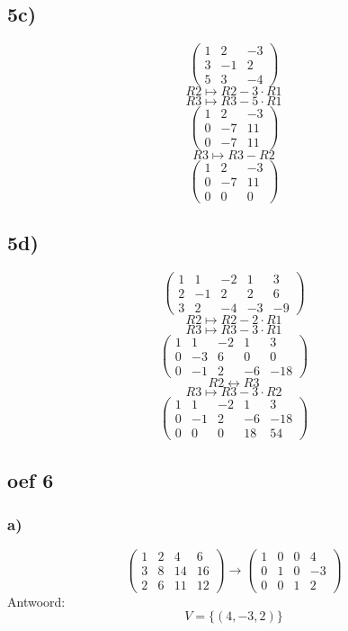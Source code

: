 \documentclass[10pt,a4paper]{article}
\begin{document}
\subsection*{5c)}
\[
\begin{pmatrix}
1 &  2 &  -3\\
3 &  -1 &  2\\
5 &  3 &  -4
\end{pmatrix}
\]
\[ R2 \longmapsto R2 -3\cdot R1\]
\[ R3 \longmapsto R3 -5\cdot R1\]
\[
\begin{pmatrix}
1 &  2 &  -3\\
0 &  -7 &  11\\
0 &  -7 &  11
\end{pmatrix}
\]
\[ R3 \longmapsto R3 - R2\]
\[
\begin{pmatrix}
1 &  2 &  -3\\
0 &  -7 &  11\\
0 &  0 &  0
\end{pmatrix}
\]

\subsection*{5d)}
\[
\begin{pmatrix}
1 &  1 &  -2 & 1 & 3\\
2 &  -1 &  2 & 2 & 6\\
3 &  2 &  -4 & -3 & -9
\end{pmatrix}
\]
\[ R2 \longmapsto R2 -2\cdot R1\]
\[ R3 \longmapsto R3 -3\cdot R1\]
\[
\begin{pmatrix}
1 &  1 &  -2 & 1 & 3\\
0 &  -3 &  6 & 0 & 0\\
0 &  -1 &  2 & -6 & -18
\end{pmatrix}
\]
\[ R2 \leftrightarrow R3\]
\[ R3 \longmapsto R3 -3\cdot R2\]
\[
\begin{pmatrix}
1 &  1 &  -2 & 1 & 3\\
0 &  -1 &  2 & -6 & -18\\
0 &  0 &  0 & 18 & 54
\end{pmatrix}
\]

\subsection*{oef 6}
\subsubsection*{a)}
\[
\begin{pmatrix}
1 &  2 &  4 &  6\\
3 &  8 & 14 & 16\\
2 &  6 & 11 & 12
\end{pmatrix}
\longrightarrow
\begin{pmatrix}
1 &  0 &  0 &  4\\
0 &  1 &  0 & -3\\
0 &  0 &  1 &  2
\end{pmatrix}
\]
Antwoord:
\[
V=\{(4,-3,2)\}
\]
\end{document}

